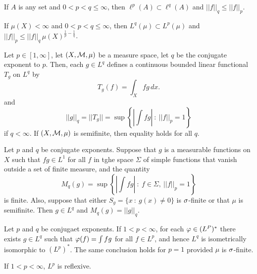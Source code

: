\vs

\begin{prop}
If $A$ is any set and $0< p < q \leq \infty$, then $\ell^p(A)\subset \ell^q(A)$ and $||f||_q\leq ||f||_p$.
\end{prop}

\vs

\begin{prop}
If $\mu(X) < \infty$ and $0< p < q \leq \infty$, then $L^q(\mu)\subset L^p(\mu)$ and $||f||_p\leq||f||_q\,\mu(X)^{\frac{1}{p}-\frac{1}{q}}$.
\end{prop}

\vs

\begin{prop}
Let $p\in[1,\infty]$, let $(X, \mathcal{M}, \mu)$ be a measure space, let $q$ be the conjugate exponent to $p$. Then, each $g\in L^q$ defines a continuous bounded linear functional $T_g$ on $L^q$ by 
\[T_g(f) = \int_X fg\,dx.\]
and 
\[||g||_q = ||T_g|| = \sup\left\{\left|\int fg\right|\ :\ ||f||_p = 1\right\}\]
if $q < \infty$. If $(X,\mathcal{M},\mu)$ is semifinite, then equality holds for all $q$.
\end{prop} 

\vs

\begin{prop}
Let $p$ and $q$ be conjugate exponents. Suppose that $g$ is a measurable functions on $X$ such that $fg\in L^1$ for all $f$ in tghe space $\Sigma$ of simple functions that vanish outside a set of finite measure, and the quantity
\[M_q(g) = \sup\left\{\left|\int fg\right|\ :\ f\in \Sigma,\ ||f||_p = 1\right\}\]
is finite. Also, suppose that either $S_g = \{x\ :\ g(x)\neq 0\}$ is $\sigma$-finite or that $\mu$ is semifinite. Then $g\in L^q$ and $M_q(g) = ||g||_q$.
\end{prop}

\vs

\begin{thm}
Let $p$ and $q$ be conjugaet exponents. If $1 < p < \infty$, for each $\varphi\in (L^P)^*$ there exists $g\in L^q$ such that $\varphi(f) = \int fg$ for all $f\in L^p$, and hence $L^q$ is isometrically isomorphic to $(L^p)^*$. The same conclusion holds for $p = 1$ provided $\mu$ is $\sigma$-finite.
\end{thm}

\vs

\begin{cor}
If $1 < p < \infty$, $L^p$ is reflexive.
\end{cor}

\vs

